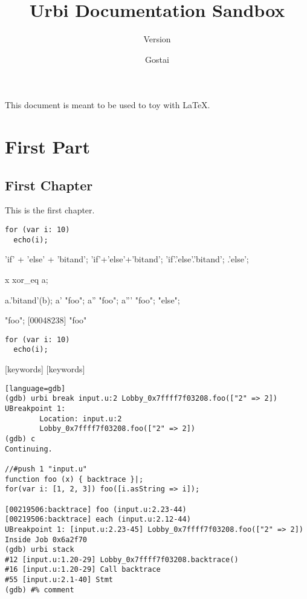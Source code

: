 \documentclass[openright,twoside,11pt]{book}
\title{Urbi Documentation Sandbox}
\subtitle{Version \VcsDescription}
\author{Gostai}
\begin{document}
\maketitle

This document is meant to be used to toy with \LaTeX{}.

\tableofcontents
\part{First Part}

\chapter{First Chapter}

This is the first chapter.

\begin{verbatim}
for (var i: 10)
  echo(i);
\end{verbatim}

\begin{urbiunchecked}
'if' + 'else' + 'bitand';
'if'+'else'+'bitand';
'if'.'else'.'bitand';
.'else';

x xor_eq a;

a.'bitand'(b);
a' "foo";
a'' "foo";
a''' "foo";
"else";

"foo";
[00048238] "foo"
\end{urbiunchecked}

\begin{verbatim}
for (var i: 10)
  echo(i);
\end{verbatim}

\ifx\ifHtml\undefined
  [keywords]
\else
  [keywords]
\fi

\begin{verbatim}[language=gdb]
(gdb) urbi break input.u:2 Lobby_0x7ffff7f03208.foo(["2" => 2])
UBreakpoint 1:
        Location: input.u:2
        Lobby_0x7ffff7f03208.foo(["2" => 2])
(gdb) c
Continuing.

//#push 1 "input.u"
function foo (x) { backtrace }|;
for(var i: [1, 2, 3]) foo([i.asString => i]);

[00219506:backtrace] foo (input.u:2.23-44)
[00219506:backtrace] each (input.u:2.12-44)
UBreakpoint 1: [input.u:2.23-45] Lobby_0x7ffff7f03208.foo(["2" => 2])
Inside Job 0x6a2f70
(gdb) urbi stack
#12 [input.u:1.20-29] Lobby_0x7ffff7f03208.backtrace()
#16 [input.u:1.20-29] Call backtrace
#55 [input.u:2.1-40] Stmt
(gdb) #% comment
\end{verbatim}
\end{document}
